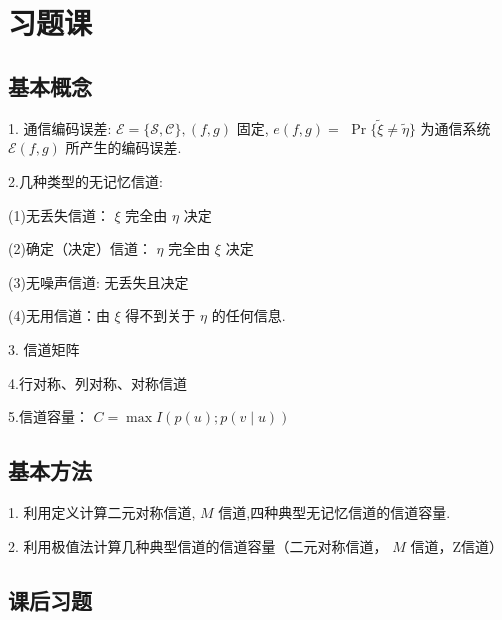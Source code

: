 \section{习题课}
\subsection{基本概念}

1. 通信编码误差: $ \mathscr{E}=\{\mathscr{S}, \mathscr{C}\},(f, g) $ 固定, $ e(f, g)= $ $ \operatorname{Pr}\{\tilde{\xi} \neq \tilde{\eta}\} $ 为通信系统 $ \mathscr{E}(f, g) $ 所产生的编码误差.

2.几种类型的无记忆信道:

(1)无丢失信道： $ \xi $ 完全由 $ \eta $ 决定

(2)确定（决定）信道： $ \eta $ 完全由 $ \xi $ 决定

(3)无噪声信道: 无丢失且决定

(4)无用信道：由 $ \xi $ 得不到关于 $ \eta $ 的任何信息.

3. 信道矩阵

4.行对称、列对称、对称信道

5.信道容量： $ C=\max I(p(u) ; p(v \mid u)) $
\subsection{基本方法}

1. 利用定义计算二元对称信道, $ M $ 信道,四种典型无记忆信道的信道容量.

2. 利用极值法计算几种典型信道的信道容量（二元对称信道， $ M $ 信道，Z信道）

\subsection{课后习题}

